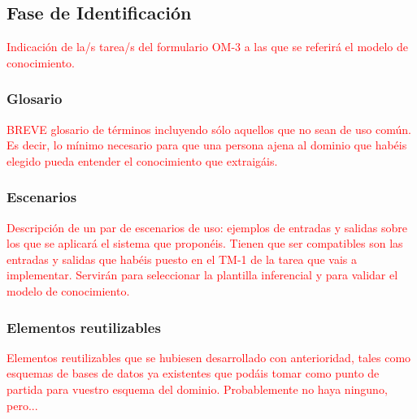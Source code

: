 \documentclass[12pt,a4paper,twoside,spanish]{article}      %
\begin{document}
\subsection{Fase de Identificación}

\textcolor {red} {Indicación de la/s tarea/s del formulario OM-3 a las que se referirá el modelo de conocimiento.}

\subsubsection{Glosario}

\textcolor {red} {BREVE glosario de términos incluyendo sólo aquellos que no sean de uso común. Es decir, lo mínimo necesario para que una persona ajena al dominio que habéis elegido pueda entender el conocimiento que extraigáis.}

\subsubsection{Escenarios}

\textcolor {red} {Descripción de un par de escenarios de uso: ejemplos de entradas y salidas sobre los que se aplicará el sistema que proponéis. Tienen que ser compatibles son las entradas y salidas que habéis puesto en el TM-1 de la tarea que vais a implementar. Servirán para seleccionar la plantilla inferencial y para validar el modelo de conocimiento.}

\subsubsection{Elementos reutilizables}

\textcolor {red} {Elementos reutilizables que se hubiesen desarrollado con anterioridad, tales como esquemas de bases de datos ya existentes que podáis tomar como punto de partida para vuestro esquema del dominio. Probablemente no haya ninguno, pero...}
\end{document}
